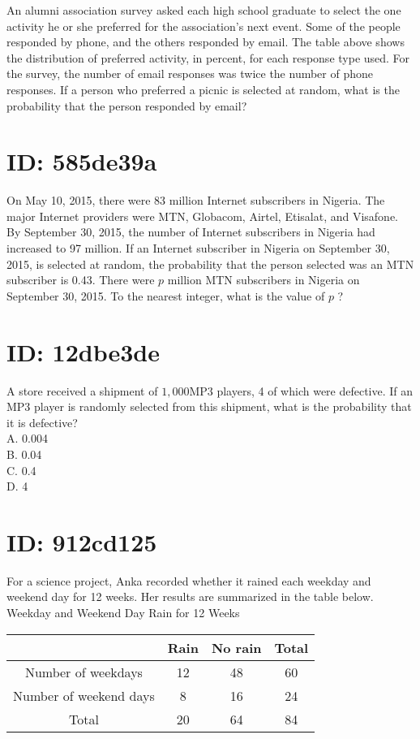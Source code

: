 An alumni association survey asked each high school graduate to select the one activity he or she preferred for the association's next event. Some of the people responded by phone, and the others responded by email. The table above shows the distribution of preferred activity, in percent, for each response type used. For the survey, the number of email responses was twice the number of phone responses. If a person who preferred a picnic is selected at random, what is the probability that the person responded by email?

\section*{ID: 585de39a}
On May 10, 2015, there were 83 million Internet subscribers in Nigeria. The major Internet providers were MTN, Globacom, Airtel, Etisalat, and Visafone. By September 30, 2015, the number of Internet subscribers in Nigeria had increased to 97 million. If an Internet subscriber in Nigeria on September 30, 2015, is selected at random, the probability that the person selected was an MTN subscriber is 0.43. There were $p$ million MTN subscribers in Nigeria on September 30, 2015. To the nearest integer, what is the value of $p$ ?

\section*{ID: 12dbe3de}
A store received a shipment of $1,000 \mathrm{MP} 3$ players, 4 of which were defective. If an MP3 player is randomly selected from this shipment, what is the probability that it is defective?\\
A. 0.004\\
B. 0.04\\
C. 0.4\\
D. 4

\section*{ID: 912cd125}
For a science project, Anka recorded whether it rained each weekday and weekend day for 12 weeks. Her results are summarized in the table below.\\
Weekday and Weekend Day Rain for 12 Weeks

\begin{center}
\begin{tabular}{|c|c|c|c|}
\hline
 & Rain & No rain & Total \\
\hline
Number of weekdays & 12 & 48 & 60 \\
\hline
Number of weekend days & 8 & 16 & 24 \\
\hline
Total & 20 & 64 & 84 \\
\hline
\end{tabular}
\end{center}

